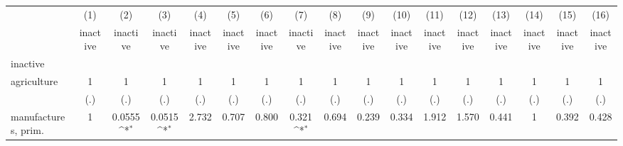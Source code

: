 {
\def\sym#1{\ifmmode^{#1}\else\(^{#1}\)\fi}
\begin{tabular}{l*{16}{c}}
\hline\hline
                    &\multicolumn{1}{c}{(1)}&\multicolumn{1}{c}{(2)}&\multicolumn{1}{c}{(3)}&\multicolumn{1}{c}{(4)}&\multicolumn{1}{c}{(5)}&\multicolumn{1}{c}{(6)}&\multicolumn{1}{c}{(7)}&\multicolumn{1}{c}{(8)}&\multicolumn{1}{c}{(9)}&\multicolumn{1}{c}{(10)}&\multicolumn{1}{c}{(11)}&\multicolumn{1}{c}{(12)}&\multicolumn{1}{c}{(13)}&\multicolumn{1}{c}{(14)}&\multicolumn{1}{c}{(15)}&\multicolumn{1}{c}{(16)}\\
                    &\multicolumn{1}{c}{inactive}&\multicolumn{1}{c}{inactive}&\multicolumn{1}{c}{inactive}&\multicolumn{1}{c}{inactive}&\multicolumn{1}{c}{inactive}&\multicolumn{1}{c}{inactive}&\multicolumn{1}{c}{inactive}&\multicolumn{1}{c}{inactive}&\multicolumn{1}{c}{inactive}&\multicolumn{1}{c}{inactive}&\multicolumn{1}{c}{inactive}&\multicolumn{1}{c}{inactive}&\multicolumn{1}{c}{inactive}&\multicolumn{1}{c}{inactive}&\multicolumn{1}{c}{inactive}&\multicolumn{1}{c}{inactive}\\
\hline
inactive            &                     &                     &                     &                     &                     &                     &                     &                     &                     &                     &                     &                     &                     &                     &                     &                     \\
agriculture         &           1         &           1         &           1         &           1         &           1         &           1         &           1         &           1         &           1         &           1         &           1         &           1         &           1         &           1         &           1         &           1         \\
                    &         (.)         &         (.)         &         (.)         &         (.)         &         (.)         &         (.)         &         (.)         &         (.)         &         (.)         &         (.)         &         (.)         &         (.)         &         (.)         &         (.)         &         (.)         &         (.)         \\
[1em]
manufactures, prim. &           1         &      0.0555\sym{*}  &      0.0515\sym{*}  &       2.732         &       0.707         &       0.800         &       0.321\sym{*}  &       0.694         &       0.239         &       0.334         &       1.912         &       1.570         &       0.441         &           1         &       0.392         &       0.428         \\

\end{tabular}}
